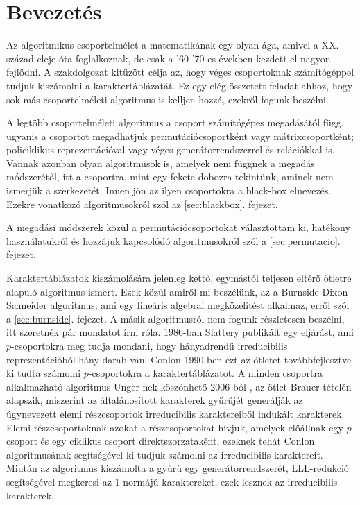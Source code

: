 \section*{Bevezetés}
\label{sec:bevezetes}
Az algoritmikus csoportelmélet a matematikának egy olyan ága, amivel a XX. század eleje óta foglalkoznak,
de csak a '60-'70-es években kezdett el nagyon fejlődni.
A szakdolgozat kitűzött célja az, hogy véges csoportoknak számítógéppel tudjuk kiszámolni a karaktertáblázatát.
Ez egy elég összetett feladat ahhoz, hogy sok más csoportelméleti algoritmus is kelljen hozzá,
ezekről fogunk beszélni.

A legtöbb csoportelméleti algoritmus a csoport számítógépes megadásától függ, ugyanis
a csoportot megadhatjuk permutációcsoportként vagy mátrixcsoportként; policiklikus reprezentációval vagy
véges generátorrendszerrel és relációkkal is.
Vannak azonban olyan algoritmusok is, amelyek nem függnek a megadás módszerétől,
itt a csoportra, mint egy fekete dobozra tekintünk, aminek nem ismerjük a szerkezetét.
Innen jön az ilyen csoportokra a black-box elnevezés.
Ezekre vonatkozó algoritmusokról szól az \ref{sec:blackbox}. fejezet.

A megadási módszerek közül a permutációcsoportokat választottam ki, hatékony használatukról és hozzájuk kapcsolódó algoritmusokról szól a \ref{sec:permutacio}. fejezet.

Karaktertáblázatok kiszámolására jelenleg kettő, egymástól teljesen eltérő ötletre alapuló algoritmus ismert.
Ezek közül amiről mi beszélünk, az a Burnside-Dixon-Schneider algoritmus, ami egy lineáris algebrai megközelítést alkalmaz,
erről szól a \ref{sec:burnside}. fejezet.
A másik algoritmusról nem fogunk részletesen beszélni, itt szeretnék pár mondatot írni róla.
1986-ban Slattery \cite{Sla86} publikált egy eljárást, ami $p$-csoportokra meg tudja mondani, hogy hányadrendű irreducibilis reprezentációból hány darab van.
Conlon 1990-ben \cite{Con90} ezt az ötletet továbbfejlesztve ki tudta számolni $p$-csoportokra a karaktertáblázatot.
A minden csoportra alkalmazható algoritmus Unger-nek köszönhető 2006-ból \cite{Ung06}, az ötlet Brauer tételén alapszik, miszerint az általánosított karakterek gyűrűjét generálják
az úgynevezett elemi részcsoportok irreducibilis karaktereiből indukált karakterek.
Elemi részcsoportoknak azokat a részcsoportokat hívjuk, amelyek előállnak egy $p$-csoport és egy ciklikus csoport direktszorzataként,
ezeknek tehát Conlon algoritmusának segítségével ki tudjuk számolni az irreducibilis karaktereit.
Miután az algoritmus kiszámolta a gyűrű egy generátorrendszerét, LLL-redukció \cite{LLL82} segítségével megkeresi az 1-normájú karaktereket, ezek lesznek az irreducibilis karakterek.

